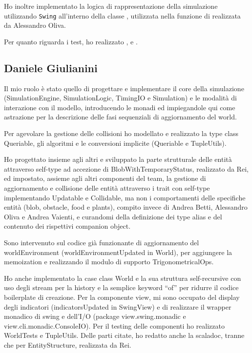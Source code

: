 Ho inoltre implementato la logica di rappresentazione della simulazione utilizzando \texttt{Swing} all'interno della classe , utilizzata nella funzione  di  realizzata da Alessandro Oliva.

Per quanto riguarda i test, ho realizzato ,  e .


\subsection{Daniele Giulianini}
Il mio ruolo è stato quello di progettare e implementare il core della simulazione (SimulationEngine, SimulationLogic, TimingIO e Simulation) e le modalità di interazione con il modello, introducendo le monadi ed impiegandole qui come astrazione per la descrizione delle fasi sequenziali di aggiornamento del world. 

Per agevolare la gestione delle collisioni ho modellato e realizzato la type class Queriable, gli algoritmi e le conversioni implicite (Queriable e TupleUtils). 

Ho progettato insieme agli altri e sviluppato la parte strutturale delle entità attraverso self-type ad accezione di BlobWithTemporaryStatus, realizzato da Rei, ed impostato, assieme agli altri componenti del team, la gestione di aggiornamento e collisione delle entità attraverso i trait con self-type implementando Updatable e Collidable, ma non i comportamenti delle specifiche entità (blob, obstacle, food e plants), compito invece di Andrea Betti, Alessandro Oliva e Andrea Vaienti, e curandomi della definizione dei type alias e del contenuto dei rispettivi companion object. 

Sono intervenuto sul codice già funzionante di aggiornamento del worldEnvironment (worldEnvironmentUpdated in World), per aggiungere la memoization e realizzando il modulo di supporto TrigonometricalOps. 

Ho anche implementato la case class World e la sua struttura self-recursive con uso degli stream per la history e la semplice keyword “of” per ridurre il codice boilerplate di creazione. Per la componente view, mi sono occupato del display degli indicatori (indicatorsUpdated in SwingView) e di realizzare il wrapper monadico di swing e dell’I/O (package view.swing.monadic e view.cli.monadic.ConsoleIO). Per il testing delle componenti ho realizzato WorldTests e TupleUtils.  Delle parti citate, ho redatto anche la scaladoc, tranne che per EntityStructure, realizzata da Rei. 


